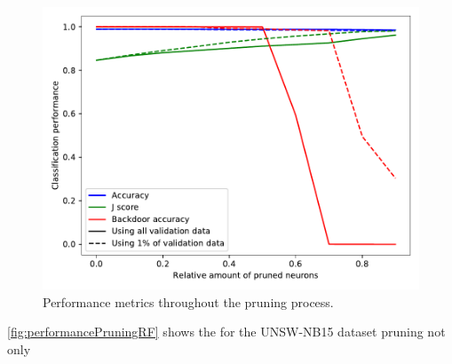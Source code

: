 \documentclass[10pt,sigconf,letterpaper,dvipsnames]{acmart}
\begin{document}
\begin{figure}[h]
\includegraphics[width=\columnwidth]{../prune_CAIA_backdoor_15/prune.pdf}
\caption{Performance metrics throughout the pruning process. }
\label{fig:performancePruningRF}
\end{figure}

\autoref{fig:performancePruningRF} shows the for the UNSW-NB15 dataset pruning not only 
\end{document}
